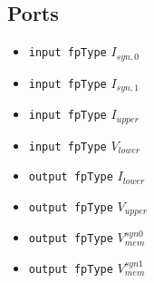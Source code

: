 \documentclass[a4paper]{report}
\begin{document}
\subsection{Ports}
	\begin{itemize}
		\item \texttt{input fpType} $I_{syn,0}$
		\item \texttt{input fpType} $I_{syn,1}$
		\item \texttt{input fpType} $I_{upper}$
		\item \texttt{input fpType} $V_{lower}$
		\item \texttt{output fpType} $I_{lower}$
		\item \texttt{output fpType} $V_{upper}$
		\item \texttt{output fpType} $V_{mem}^{syn0}$
		\item \texttt{output fpType} $V_{mem}^{syn1}$
	\end{itemize}
\end{document}
